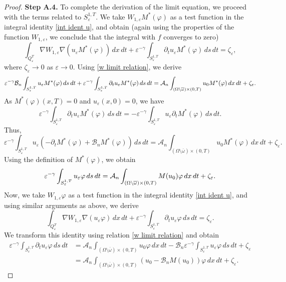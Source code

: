 \documentclass[reqno]{amsart}
\begin{document}
\begin{proof}
\noindent\textbf{Step A.4.} 
To complete the derivation of the limit equation, we
proceed with the terms related to $S_{\varepsilon }^{1,T}$. We take $%
W_{1,\varepsilon }M^{\ast }(\varphi )$ as a test function in the integral
identity \eqref{int ident u}, and obtain (again using the properties of the
function $W_{1,\varepsilon }$, we conclude that the integral with $f$
converges to zero)
\[
\int _{Q_{\varepsilon }^{T}}\nabla W_{1,\varepsilon }\nabla
(u_{\varepsilon }M^{\ast }(\varphi ))\,dx\,dt+\varepsilon ^{-\gamma }\int
_{S_{\varepsilon }^{1,T}}\partial _{t}u_{\varepsilon }M^{\ast
}(\varphi )\,ds\,dt=\zeta _{\varepsilon },
\]
where $\zeta _{\varepsilon }\to 0$ as $\varepsilon \to 0$.
Using \eqref{w limit relation}, we derive
\[
\varepsilon ^{-\gamma }\mathcal{B}_n\int _{S_{\varepsilon
}^{1,T}}u_{\varepsilon }M^{\ast }(\varphi )\,ds\,dt+\varepsilon ^{-\gamma
}\int _{S_{\varepsilon }^{1,T}}\partial _{t}u_{\varepsilon }M^{\ast
}(\varphi )\,ds\,dt=\mathcal{A}_n\int _{(\Omega \setminus \overline{%
\omega })\times (0,T)}u_0M^{\ast }(\varphi )\,dx\,dt+\zeta _{\varepsilon }.
\]%
As $M^{\ast }(\varphi )(x,T)=0$ and $u_{\varepsilon }(x,0)=0$, we have
\[
\varepsilon ^{-\gamma }\int _{S_{\varepsilon }^{1,T}}\partial
_{t}u_{\varepsilon }M^{\ast }(\varphi )\,ds\,dt=-\varepsilon ^{-\gamma }\int
_{S_{\varepsilon }^{1,T}}u_{\varepsilon }\partial _{t}M^{\ast
}(\varphi )\,ds\,dt.
\]
Thus,
\[
\varepsilon ^{-\gamma }\int _{S_{\varepsilon }^{1,T}}u_{\varepsilon
}(-\partial _{t}M^{\ast }(\varphi )+\mathcal{B}_nM^{\ast }(\varphi ))\,ds\,dt%
=\mathcal{A}_n\int _{(\Omega \setminus \overline{\omega })\times
(0,T)}u_0M^{\ast }(\varphi )\,dx\,dt+\zeta _{\varepsilon }.
\]%
Using the definition of $M^{\ast }(\varphi )$, we obtain
\begin{equation}  \label{u conv uncont}
\varepsilon ^{-\gamma }\int _{S_{\varepsilon }^{1,T}}u_{\varepsilon
}\varphi \,ds\,dt=\mathcal{A}_n\int _{(\Omega \setminus \overline{%
\omega })\times (0,T)}M(u_0)\varphi \,dx\,dt+\zeta _{\varepsilon }.
\end{equation}
Now, we take $W_{1,\varepsilon }\varphi $ as a test function in the integral
identity \eqref{int ident u}, and using similar arguments as above, we
derive
\[
\int _{Q_{\varepsilon }^{T}}\nabla W_{1,\varepsilon }\nabla
(u_{\varepsilon }\varphi )\,dx\,dt+\varepsilon ^{-\gamma }\int
_{S_{\varepsilon }^{1,T}}\partial _{t}u_{\varepsilon }\varphi \,ds\,dt%
=\zeta _{\varepsilon }.
\]
We transform this identity using relation \eqref{w limit relation} and
obtain
\begin{equation}
\begin{aligned}
\varepsilon ^{-\gamma }\int _{S_{\varepsilon }^{1,T}}\partial
_{t}u_{\varepsilon }\varphi \,ds\,dt
&=\mathcal{A}_n\int _{(\Omega
\setminus \overline{\omega })\times (0,T)}u_0\varphi \,dx\,dt-\mathcal{B}%
_n\varepsilon ^{-\gamma }\int _{S_{\varepsilon
}^{1,T}}u_{\varepsilon }\varphi \,ds\,dt+\zeta _{\varepsilon }    \\
&=\mathcal{A}_n\int _{(\Omega \setminus \overline{\omega })\times
(0,T)}(u_0-\mathcal{B}_nM(u_0))\varphi \,dx\,dt+\zeta _{\varepsilon }.
\end{aligned} \label{pa_t u conv uncontrol}
\end{equation}


\end{proof}
\end{document}
